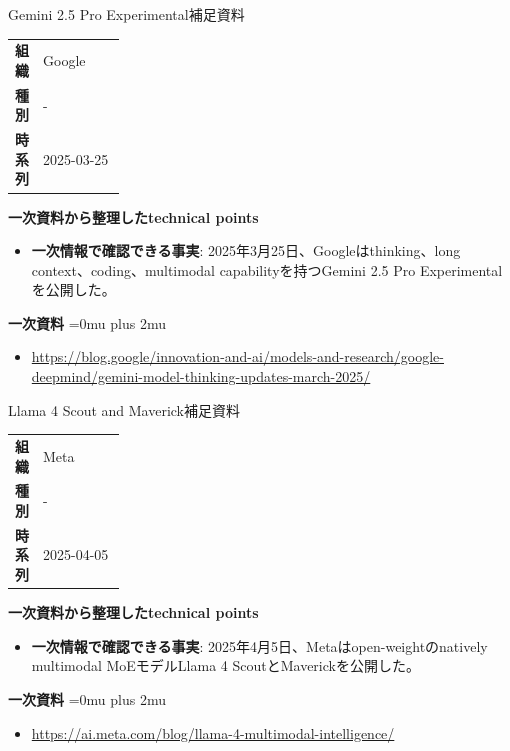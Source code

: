 \begin{technicalnote}{Gemini 2.5 Pro Experimental}{補足資料}
\begingroup
\begin{tabularx}{\linewidth}{@{}>{\bfseries}p{0.22\linewidth}X@{}}
組織 & Google \\
種別 & - \\
時系列 & 2025-03-25 \\
\end{tabularx}
\smallskip
{\bfseries 一次資料から整理したtechnical points}
\begin{itemize}[leftmargin=1.5em,itemsep=0.35em]
\item \textbf{一次情報で確認できる事実}: 2025年3月25日、Googleはthinking、long context、coding、multimodal capabilityを持つGemini 2.5 Pro Experimentalを公開した。
\end{itemize}
\begin{samepage}
{\bfseries 一次資料}
\begingroup\sloppy
\Urlmuskip=0mu plus 2mu\relax
\begin{itemize}[leftmargin=1.5em,itemsep=0.25em]
\item {\scriptsize\url{https://blog.google/innovation-and-ai/models-and-research/google-deepmind/gemini-model-thinking-updates-march-2025/}}
\end{itemize}
\endgroup
\end{samepage}
\endgroup
\end{technicalnote}
\medskip

\begin{technicalnote}{Llama 4 Scout and Maverick}{補足資料}
\begingroup
\begin{tabularx}{\linewidth}{@{}>{\bfseries}p{0.22\linewidth}X@{}}
組織 & Meta \\
種別 & - \\
時系列 & 2025-04-05 \\
\end{tabularx}
\smallskip
{\bfseries 一次資料から整理したtechnical points}
\begin{itemize}[leftmargin=1.5em,itemsep=0.35em]
\item \textbf{一次情報で確認できる事実}: 2025年4月5日、Metaはopen-weightのnatively multimodal MoEモデルLlama 4 ScoutとMaverickを公開した。
\end{itemize}
\begin{samepage}
{\bfseries 一次資料}
\begingroup\sloppy
\Urlmuskip=0mu plus 2mu\relax
\begin{itemize}[leftmargin=1.5em,itemsep=0.25em]
\item {\scriptsize\url{https://ai.meta.com/blog/llama-4-multimodal-intelligence/}}
\end{itemize}
\endgroup
\end{samepage}
\endgroup
\end{technicalnote}
\medskip

